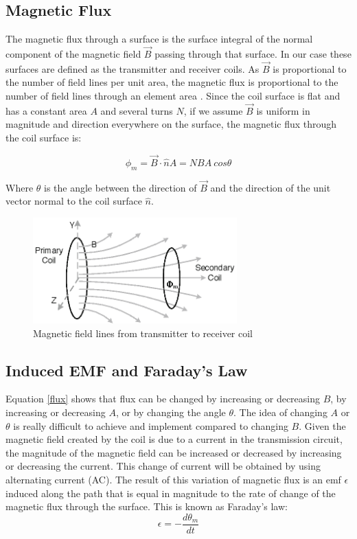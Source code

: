 		\subsection{Magnetic Flux}
The magnetic flux through a surface is the surface integral of the normal component of the magnetic field $\vec{B}$ passing through that surface. In our case these surfaces are defined as the transmitter and receiver coils. As $\vec{B}$ is proportional to the number of field lines per unit area, the magnetic flux is proportional to the number of field lines through an element area \cite{tipler}. Since the coil surface is flat and has a constant area $A$ and several turns $N$, if we assume $\vec{B}$ is uniform in magnitude and direction everywhere on the surface, the magnetic flux through the coil surface is:

  \begin{equation} \label{flux}
    {\phi_m} = \vec{B}\cdot\hat{n}A = NBA\:cos{\theta} 			%
  \end{equation}

 Where $\theta$ is the angle between the direction of $\vec{B}$ and the direction of the unit vector normal to the coil surface $\hat{n}$.

\begin{figure}[htb]
\begin{center}
	\includegraphics[width=0.7\textwidth]{./images/magneticFlux}
\caption{Magnetic field lines from transmitter to receiver coil}
\label{F:magneticFlux}
\end{center}
\end{figure}

		\subsection{Induced EMF and Faraday's Law}
Equation \ref{flux} shows that flux can be changed by increasing or decreasing $B$, by increasing or decreasing $A$, or by changing the angle ${\theta}$. The idea of changing $A$ or ${\theta}$ is really difficult to achieve and implement compared to changing $B$. Given the magnetic field created by the coil is due to a current in the transmission circuit, the magnitude of the magnetic field can be increased or decreased by increasing or decreasing the current. This change of current will be obtained by using alternating current (AC). The result of this variation of magnetic flux is an emf ${\epsilon}$ induced along the path that is equal in magnitude to the rate of change of the magnetic flux through the surface. This is known as Faraday's law:
  \begin{equation} 
    {\epsilon} = -\frac{d{\theta_m}}{dt}
  \end{equation}

